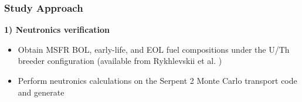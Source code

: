 \begin{frame}
	\frametitle{Study Approach}
		\textbf{1) Neutronics verification} \\
		\begin{itemize}
			\item Obtain \gls{MSFR} \gls{BOL}, early-life, and \gls{EOL} fuel
			compositions under the U/Th breeder configuration (available from
			Rykhlevskii et al. \cite{rykhlevskii_fuel_2019})
			\item Perform neutronics calculations on the Serpent 2 Monte Carlo
			transport code and generate
		\end{itemize}
\end{frame}